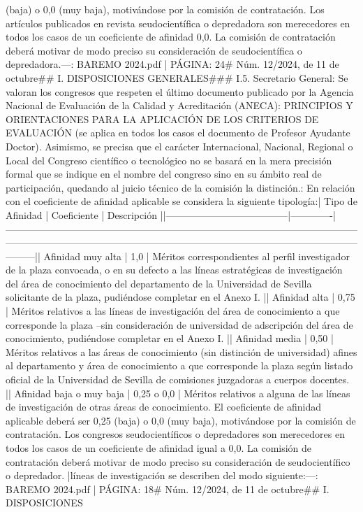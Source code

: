 \documentclass{article}
\begin{document}
\begin{itemize}
{(baja) o 0,0 (muy baja), motivándose por la comisión de contratación. Los artículos publicados en revista seudocientífica o depredadora son merecedores en todos los casos de un coeficiente de afinidad 0,0. La comisión de contratación deberá motivar de modo preciso su consideración de seudocientífica o depredadora.\n\n---\n\nFUENTE: BAREMO 2024.pdf | PÁGINA: 24\n# Núm. 12/2024, de 11 de octubre\n\n## I. DISPOSICIONES GENERALES\n\n### I.5. Secretario General\n{}: Se valoran los congresos que respeten el último documento publicado por la Agencia Nacional de Evaluación de la Calidad y Acreditación (ANECA): PRINCIPIOS Y ORIENTACIONES PARA LA APLICACIÓN DE LOS CRITERIOS DE EVALUACIÓN (se aplica en todos los casos el documento de Profesor Ayudante Doctor). Asimismo, se precisa que el carácter Internacional, Nacional, Regional o Local del Congreso científico o tecnológico no se basará en la mera precisión formal que se indique en el nombre del congreso sino en su ámbito real de participación, quedando al juicio técnico de la comisión la distinción.\n{}: En relación con el coeficiente de afinidad aplicable se considera la siguiente tipología:\n\n| Tipo de Afinidad                     | Coeficiente | Descripción                                                                                                                                                                                                                     |\n|--------------------------------------|-------------|---------------------------------------------------------------------------------------------------------------------------------------------------------------------------------------------------------------------------------|\n| Afinidad muy alta                    | 1,0         | Méritos correspondientes al perfil investigador de la plaza convocada, o en su defecto a las líneas estratégicas de investigación del área de conocimiento del departamento de la Universidad de Sevilla solicitante de la plaza, pudiéndose completar en el Anexo I. |\n| Afinidad alta                        | 0,75        | Méritos relativos a las líneas de investigación del área de conocimiento a que corresponde la plaza –sin consideración de universidad de adscripción del área de conocimiento, pudiéndose completar en el Anexo I.               |\n| Afinidad media                       | 0,50        | Méritos relativos a las áreas de conocimiento (sin distinción de universidad) afines al departamento y área de conocimiento a que corresponde la plaza según listado oficial de la Universidad de Sevilla de comisiones juzgadoras a cuerpos docentes. |\n| Afinidad baja o muy baja             | 0,25 o 0,0  | Méritos relativos a alguna de las líneas de investigación de otras áreas de conocimiento. El coeficiente de afinidad aplicable deberá ser 0,25 (baja) o 0,0 (muy baja), motivándose por la comisión de contratación. Los congresos seudocientíficos o depredadores son merecedores en todos los casos de un coeficiente de afinidad igual a 0,0. La comisión de contratación deberá motivar de modo preciso su consideración de seudocientífico o depredador. |\n\nLas líneas de investigación se describen del modo siguiente:\n\n---\n\nFUENTE: BAREMO 2024.pdf | PÁGINA: 18\n# Núm. 12/2024, de 11 de octubre\n\n## I. DISPOSICIONES }
\end{itemize}
\end{document}
